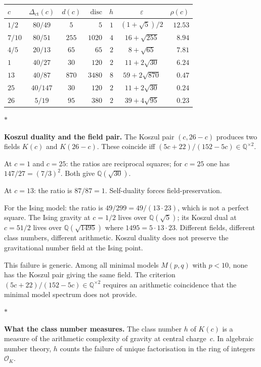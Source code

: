 \documentclass[11pt]{article}
\newcommand{\cO}{\mathcal{O}}
\newcommand{\Q}{\mathbb{Q}}
\newcommand{\sep}{\bigskip\begin{center}$*$\end{center}\medskip}
\begin{document}
\begin{center}
\small
\renewcommand{\arraystretch}{1.15}
\begin{tabular}{@{}lccrrcr@{}}
$c$
  & $\Delta_{\mathrm{ct}}(c)$
  & $d(c)$
  & $\mathrm{disc}$
  & $h$
  & $\varepsilon$
  & $\rho(c)$ \\
\hline
$1/2$ & $80/49$ & $5$ & $5$ & $1$
  & $(1{+}\sqrt{5})/2$ & $12.53$ \\[2pt]
$7/10$ & $80/51$ & $255$ & $1020$ & $4$
  & $16{+}\sqrt{255}$ & $8.94$ \\[2pt]
$4/5$ & $20/13$ & $65$ & $65$ & $2$
  & $8{+}\sqrt{65}$ & $7.81$ \\[2pt]
$1$ & $40/27$ & $30$ & $120$ & $2$
  & $11{+}2\sqrt{30}$ & $6.24$ \\[2pt]
$13$ & $40/87$ & $870$ & $3480$ & $8$
  & $59{+}2\sqrt{870}$ & $0.47$ \\[2pt]
$25$ & $40/147$ & $30$ & $120$ & $2$
  & $11{+}2\sqrt{30}$ & $0.24$ \\[2pt]
$26$ & $5/19$ & $95$ & $380$ & $2$
  & $39{+}4\sqrt{95}$ & $0.23$
\end{tabular}
\end{center}

\sep

\noindent\textbf{Koszul duality and the field pair.}\enspace
The Koszul pair $(c, 26-c)$ produces two fields $K(c)$
and $K(26-c)$.  These coincide iff
$(5c+22)/(152-5c) \in \Q^{\times 2}$.

At $c = 1$ and $c = 25$: the ratios are reciprocal squares;
for $c = 25$ one has $147/27 = (7/3)^2$.
Both give $\Q(\sqrt{30})$.

At $c = 13$: the ratio is $87/87 = 1$.  Self-duality forces
field-preservation.

For the Ising model: the ratio is $49/299 = 49/(13 \cdot 23)$,
which is not a perfect square.  The Ising gravity at $c = 1/2$
lives over $\Q(\sqrt{5})$; its Koszul dual at $c = 51/2$
lives over $\Q(\sqrt{1495})$ where $1495 = 5 \cdot 13 \cdot 23$.
Different fields, different class numbers, different arithmetic.
Koszul duality does not preserve the gravitational number field
at the Ising point.

This failure is generic.  Among all minimal models $M(p,q)$
with $p < 10$, none has the Koszul pair giving the same field.
The criterion $(5c+22)/(152-5c) \in \Q^{\times 2}$ requires
an arithmetic coincidence that the minimal model spectrum
does not provide.

\sep

\noindent\textbf{What the class number measures.}\enspace
The class number $h$ of $K(c)$ is a measure of the
arithmetic complexity of gravity at central charge~$c$.
In algebraic number theory, $h$ counts the failure of
unique factorisation in the ring of integers $\cO_K$.
\end{document}
